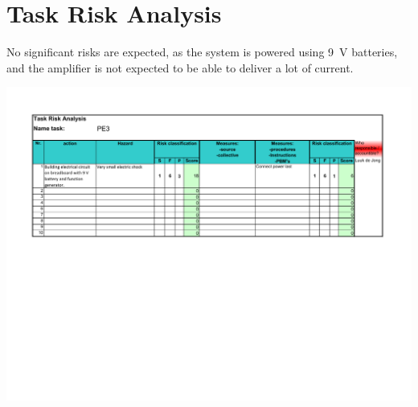 \documentclass{article}
\begin{document}
\section{Task Risk Analysis}
No significant risks are expected, as the system is powered using \SI{9}{\V} batteries, and the amplifier is not expected to be able to deliver a lot of current.
\begin{center}
  \includegraphics[width=\linewidth, trim={17mm, 112mm, 20mm, 19mm}, clip]{tra.pdf}
\end{center}
\printbibliography{}
\end{document}
